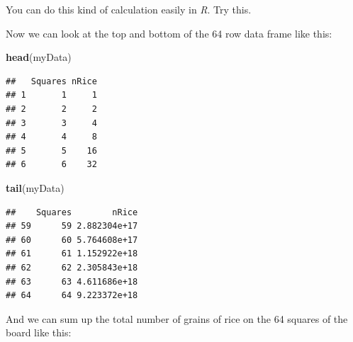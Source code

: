 \documentclass[
  a4paper]{book}
\newenvironment{Shaded}{\begin{snugshade}}{\end{snugshade}}
\newcommand{\AttributeTok}[1]{\textcolor[rgb]{0.13,0.29,0.53}{#1}}
\newcommand{\ConstantTok}[1]{\textcolor[rgb]{0.56,0.35,0.01}{#1}}
\newcommand{\ControlFlowTok}[1]{\textcolor[rgb]{0.13,0.29,0.53}{\textbf{#1}}}
\newcommand{\DecValTok}[1]{\textcolor[rgb]{0.00,0.00,0.81}{#1}}
\newcommand{\FunctionTok}[1]{\textcolor[rgb]{0.13,0.29,0.53}{\textbf{#1}}}
\newcommand{\NormalTok}[1]{#1}
\newcommand{\OtherTok}[1]{\textcolor[rgb]{0.56,0.35,0.01}{#1}}
\newcommand{\SpecialCharTok}[1]{\textcolor[rgb]{0.81,0.36,0.00}{\textbf{#1}}}
\begin{document}
You can do this kind of calculation easily in \emph{R}. Try this.

\begin{Shaded}
\end{Shaded}

Now we can look at the top and bottom of the 64 row data frame like this:

\begin{Shaded}
\begin{Highlighting}[]
\FunctionTok{head}\NormalTok{(myData)}
\end{Highlighting}
\end{Shaded}

\begin{verbatim}
##   Squares nRice
## 1       1     1
## 2       2     2
## 3       3     4
## 4       4     8
## 5       5    16
## 6       6    32
\end{verbatim}

\begin{Shaded}
\begin{Highlighting}[]
\FunctionTok{tail}\NormalTok{(myData)}
\end{Highlighting}
\end{Shaded}

\begin{verbatim}
##    Squares        nRice
## 59      59 2.882304e+17
## 60      60 5.764608e+17
## 61      61 1.152922e+18
## 62      62 2.305843e+18
## 63      63 4.611686e+18
## 64      64 9.223372e+18
\end{verbatim}

And we can sum up the total number of grains of rice on the 64 squares of the board like this:

\begin{Shaded}
\end{Shaded}
\end{document}
